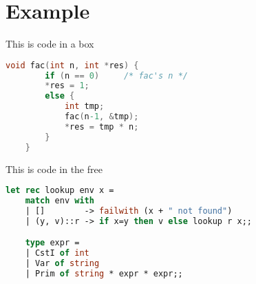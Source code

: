 \documentclass{ituhandin}
\begin{document}
\maketitlepage
\signpage

\chapter*{Example}

This is code in a box

\begin{lstlisting}[language=C, caption=This is a caption]
    void fac(int n, int *res) {
        if (n == 0)     /* fac's n */
        *res = 1;
        else {
            int tmp;
            fac(n-1, &tmp);
            *res = tmp * n;
        }
    }
\end{lstlisting}


This is code in the free

\begin{lstlisting}[language=ML, frame={}]
    let rec lookup env x =
    match env with 
    | []        -> failwith (x + " not found")
    | (y, v)::r -> if x=y then v else lookup r x;;

    type expr = 
    | CstI of int
    | Var of string
    | Prim of string * expr * expr;;
\end{lstlisting}

\label{LastPage}
\end{document}
